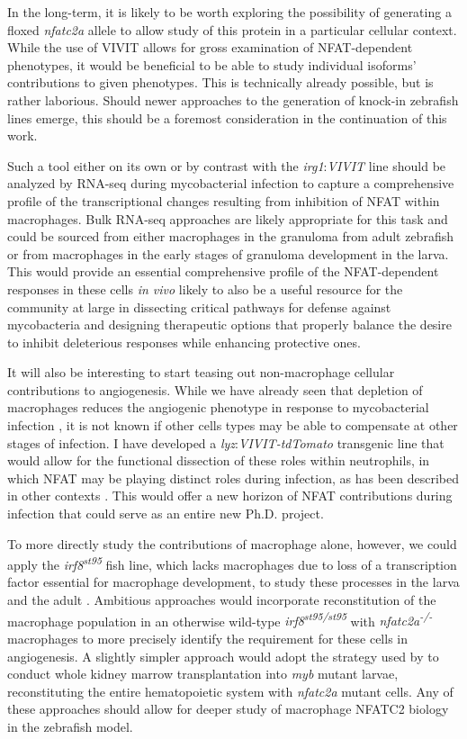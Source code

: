 In the long\hyp{}term, it is likely to be worth exploring the possibility of generating a floxed \textit{nfatc2a} allele to allow study of this protein in a particular cellular context. While the use of VIVIT allows for gross examination of NFAT\hyp{}dependent phenotypes, it would be beneficial to be able to study individual isoforms' contributions to given phenotypes. This is technically already possible, but is rather laborious. Should newer approaches to the generation of knock\hyp{}in zebrafish lines emerge, this should be a foremost consideration in the continuation of this work.

Such a tool either on its own or by contrast with the \textit{irg1}:\textit{VIVIT} line should be analyzed by RNA\hyp{}seq during mycobacterial infection to capture a comprehensive profile of the transcriptional changes resulting from inhibition of NFAT within macrophages. Bulk RNA\hyp{}seq approaches are likely appropriate for this task and could be sourced from either macrophages in the granuloma from adult zebrafish or from macrophages in the early stages of granuloma development in the larva. This would provide an essential comprehensive profile of the NFAT\hyp{}dependent responses in these cells \textit{in vivo} likely to also be a useful resource for the community at large in dissecting critical pathways for defense against mycobacteria and designing therapeutic options that properly balance the desire to inhibit deleterious responses while enhancing protective ones.

It will also be interesting to start teasing out non\hyp{}macrophage cellular contributions to angiogenesis. While we have already seen that depletion of macrophages reduces the angiogenic phenotype in response to mycobacterial infection \citep{Oehlers2015}, it is not known if other cells types may be able to compensate at other stages of infection. I have developed a \textit{lyz}:\textit{VIVIT\hyp{}tdTomato} transgenic line that would allow for the functional dissection of these roles within neutrophils, in which NFAT may be playing distinct roles during infection, as has been described in other contexts \citep{Herbst2015, Vymazal2021, Vega2007}. This would offer a new horizon of NFAT contributions during infection that could serve as an entire new Ph.D. project.

To more directly study the contributions of macrophage alone, however, we could apply the \textit{irf8\textsuperscript{st95}} fish line, which lacks macrophages due to loss of a transcription factor essential for macrophage development, to study these processes in the larva and the adult \citep{Shiau2015, Xu2012, Tamura2005}. Ambitious approaches would incorporate reconstitution of the macrophage population in an otherwise wild\hyp{}type \textit{irf8\textsuperscript{st95/st95}} with \textit{nfatc2a\textsuperscript{\hyp{}/\hyp{}}} macrophages to more precisely identify the requirement for these cells in angiogenesis. A slightly simpler approach would adopt the strategy used by \citet{Cronan2021} to conduct whole kidney marrow transplantation into \textit{myb} mutant larvae, reconstituting the entire hematopoietic system with \textit{nfatc2a} mutant cells. Any of these approaches should allow for deeper study of macrophage NFATC2 biology in the zebrafish model.

